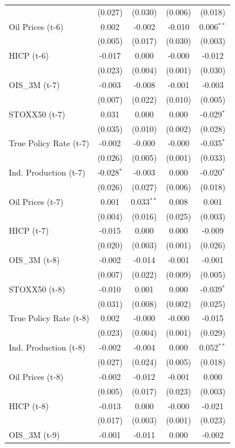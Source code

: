 \begin{longtable}[t]{lcccc}
 & (0.027) & (0.030) & (0.006) & (0.018)\\
Oil Prices (t-6) & 0.002 & -0.002 & -0.010 & 0.006$^{**}$\\
 & (0.005) & (0.017) & (0.030) & (0.003)\\
HICP (t-6) & -0.017 & 0.000 & -0.000 & -0.012\\
 & (0.023) & (0.004) & (0.001) & (0.030)\\
OIS\_3M (t-7) & -0.003 & -0.008 & -0.001 & -0.003\\
 & (0.007) & (0.022) & (0.010) & (0.005)\\
STOXX50 (t-7) & 0.031 & 0.000 & 0.000 & -0.029$^{*}$\\
 & (0.035) & (0.010) & (0.002) & (0.028)\\
True Policy Rate (t-7) & -0.002 & -0.000 & -0.000 & -0.035$^{*}$\\
 & (0.026) & (0.005) & (0.001) & (0.033)\\
Ind. Production (t-7) & -0.028$^{*}$ & -0.003 & 0.000 & -0.020$^{*}$\\
 & (0.026) & (0.027) & (0.006) & (0.018)\\
Oil Prices (t-7) & 0.001 & 0.033$^{**}$ & 0.008 & 0.001\\
 & (0.004) & (0.016) & (0.025) & (0.003)\\
HICP (t-7) & -0.015 & 0.000 & 0.000 & -0.009\\
 & (0.020) & (0.003) & (0.001) & (0.026)\\
OIS\_3M (t-8) & -0.002 & -0.014 & -0.001 & -0.001\\
 & (0.007) & (0.022) & (0.009) & (0.005)\\
STOXX50 (t-8) & -0.010 & 0.001 & 0.000 & -0.039$^{*}$\\
 & (0.031) & (0.008) & (0.002) & (0.025)\\
True Policy Rate (t-8) & 0.002 & -0.000 & -0.000 & -0.015\\
 & (0.023) & (0.004) & (0.001) & (0.029)\\
Ind. Production (t-8) & -0.002 & -0.004 & 0.000 & 0.052$^{**}$\\
 & (0.027) & (0.024) & (0.005) & (0.018)\\
Oil Prices (t-8) & -0.002 & -0.012 & -0.001 & 0.000\\
 & (0.005) & (0.017) & (0.023) & (0.003)\\
HICP (t-8) & -0.013 & 0.000 & -0.000 & -0.021\\
 & (0.017) & (0.003) & (0.001) & (0.023)\\
OIS\_3M (t-9) & -0.001 & -0.011 & 0.000 & -0.002\\

\end{longtable}
